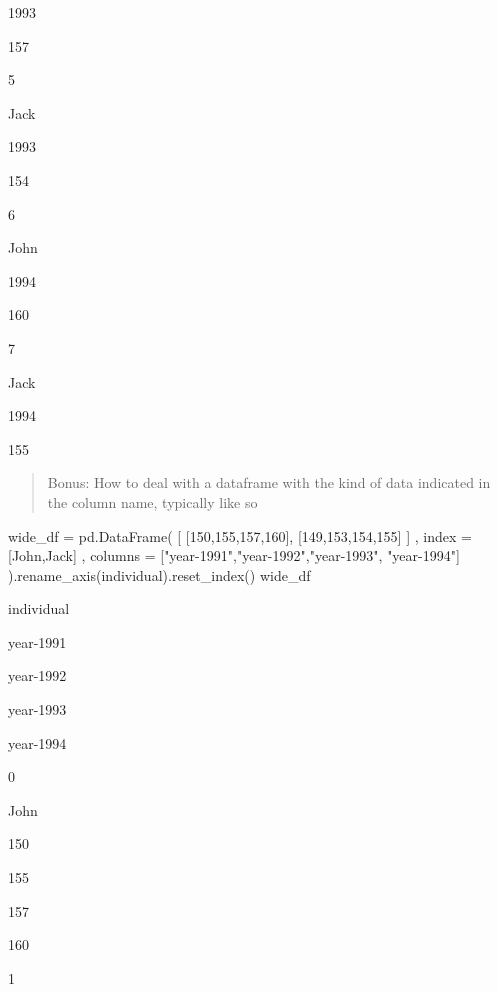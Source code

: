 \documentclass[
  letterpaper,
]{book}
\newenvironment{Shaded}{}{}
\newcommand{\DecValTok}[1]{\textcolor[rgb]{0.00,0.36,0.77}{#1}}
\newcommand{\NormalTok}[1]{\textcolor[rgb]{0.14,0.16,0.18}{#1}}
\newcommand{\OperatorTok}[1]{\textcolor[rgb]{0.14,0.16,0.18}{#1}}
\newcommand{\StringTok}[1]{\textcolor[rgb]{0.01,0.18,0.38}{#1}}
\begin{document}
1993

157

5

Jack

1993

154

6

John

1994

160

7

Jack

1994

155

\begin{quote}
Bonus: How to deal with a dataframe with the kind of data indicated in
the column name, typically like so
\end{quote}

\begin{Shaded}
\begin{Highlighting}[]
\NormalTok{wide\_df }\OperatorTok{=}\NormalTok{ pd.DataFrame(}
\NormalTok{    [}
\NormalTok{    [}\DecValTok{150}\NormalTok{,}\DecValTok{155}\NormalTok{,}\DecValTok{157}\NormalTok{,}\DecValTok{160}\NormalTok{],}
\NormalTok{    [}\DecValTok{149}\NormalTok{,}\DecValTok{153}\NormalTok{,}\DecValTok{154}\NormalTok{,}\DecValTok{155}\NormalTok{]}
\NormalTok{    ]}
\NormalTok{    , index }\OperatorTok{=}\NormalTok{ [}\StringTok{\textquotesingle{}John\textquotesingle{}}\NormalTok{,}\StringTok{\textquotesingle{}Jack\textquotesingle{}}\NormalTok{]}
\NormalTok{    , columns }\OperatorTok{=}\NormalTok{ [}\StringTok{"year{-}1991"}\NormalTok{,}\StringTok{"year{-}1992"}\NormalTok{,}\StringTok{"year{-}1993"}\NormalTok{, }\StringTok{"year{-}1994"}\NormalTok{]}
\NormalTok{).rename\_axis(}\StringTok{\textquotesingle{}individual\textquotesingle{}}\NormalTok{).reset\_index()}
\NormalTok{wide\_df}
\end{Highlighting}
\end{Shaded}

individual

year-1991

year-1992

year-1993

year-1994

0

John

150

155

157

160

1
\end{document}
